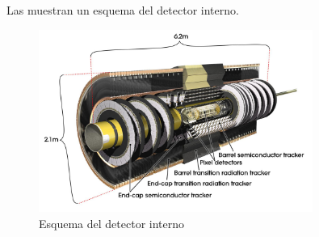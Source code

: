 
Las  muestran un esquema del detector interno.

\begin{figure}
\centering
  \includegraphics[width=0.8\textwidth]{images/pixel_2.jpg}
  \caption{Esquema del detector interno}
  \label{pixel_1}
\end{figure}

